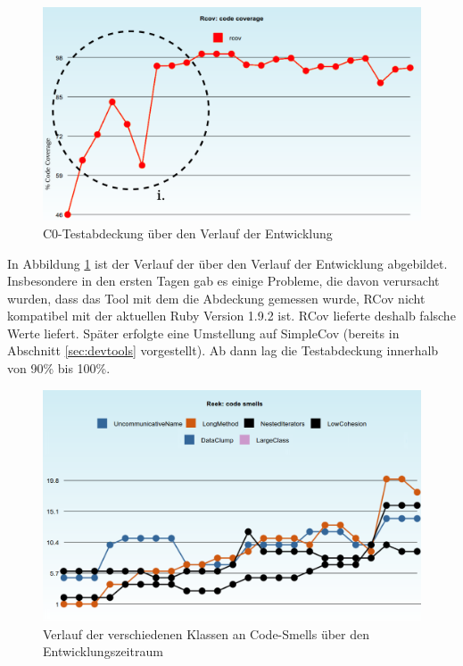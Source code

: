\begin{figure}[htbp]
 \centering
 \includegraphics[width=\textwidth]{./diagrams/itjobs-coverage.pdf}
 \caption{C0-Testabdeckung über den Verlauf der Entwicklung}
 \label{fig:itjobsCoverage}
\end{figure}
In Abbildung \ref{fig:itjobsCoverage} ist der Verlauf der  über den Verlauf der Entwicklung abgebildet. Insbesondere in den ersten Tagen gab es einige Probleme, die davon verursacht wurden, dass das Tool mit dem die Abdeckung gemessen wurde, RCov nicht kompatibel mit der aktuellen Ruby Version 1.9.2 ist. RCov lieferte deshalb falsche Werte liefert. Später erfolgte eine Umstellung auf SimpleCov (bereits in Abschnitt \ref{sec:devtools} vorgestellt). Ab dann lag die Testabdeckung innerhalb von 90\% bis 100\%.

\begin{figure}[htbp]
 \centering
 \includegraphics[width=\textwidth]{./diagrams/itjobs-smells.png}
 \caption{Verlauf der verschiedenen Klassen an Code-Smells über den Entwicklungszeitraum}
 \label{fig:itjobsSmells}
\end{figure}

